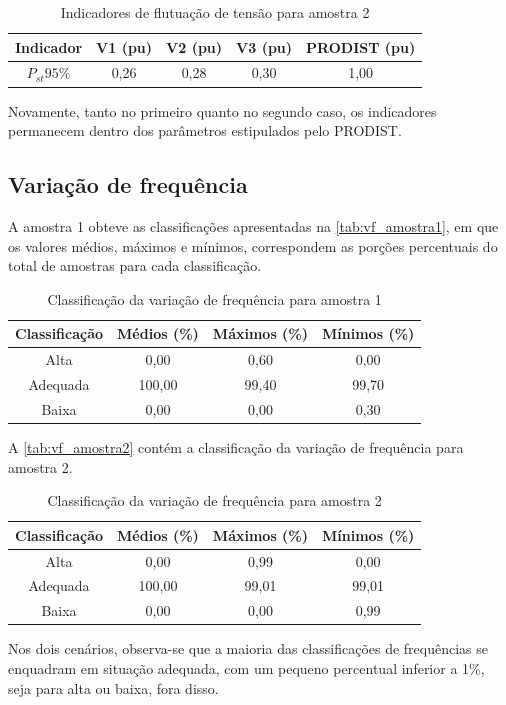 \begin{table}[H]
  \centering
  \caption{Indicadores de flutuação de tensão para amostra 2}
  \label{tab:ft_amostra2}
  \begin{tabular}{@{}ccccc@{}}
    \toprule
    Indicador & V1 (pu) & V2 (pu) & V3 (pu) & PRODIST  (pu) \\
    \midrule
    $P_{st}95\%$   & 0,26 & 0,28 & 0,30 & 1,00 \\
    \bottomrule
  \end{tabular}
\end{table}

Novamente, tanto no primeiro quanto no segundo caso, os indicadores permanecem dentro dos parâmetros estipulados pelo PRODIST.

\subsection{Variação de frequência}

A amostra 1 obteve as classificações apresentadas na \autoref{tab:vf_amostra1}, em que os valores médios, máximos e mínimos, correspondem as porções percentuais do total de amostras para cada classificação.

\begin{table}[H]
  \centering
  \caption{Classificação da variação de frequência para amostra 1}
  \label{tab:vf_amostra1}
  \begin{tabular}{@{}cccc@{}}
    \toprule
    Classificação & Médios (\%) & Máximos (\%) & Mínimos (\%) \\
    \midrule
    Alta & 0,00 & 0,60 & 0,00 \\
    Adequada & 100,00 & 99,40 & 99,70 \\
    Baixa & 0,00 & 0,00 & 0,30 \\
    \bottomrule
  \end{tabular}
\end{table}

A \autoref{tab:vf_amostra2} contém a classificação da variação de frequência para amostra 2.

\begin{table}[H]
  \centering
  \caption{Classificação da variação de frequência para amostra 2}
  \label{tab:vf_amostra2}
  \begin{tabular}{@{}cccc@{}}
    \toprule
    Classificação & Médios (\%) & Máximos (\%) & Mínimos (\%) \\
    \midrule
    Alta & 0,00 & 0,99 & 0,00 \\
    Adequada & 100,00 & 99,01 & 99,01 \\
    Baixa & 0,00 & 0,00 & 0,99 \\
    \bottomrule
  \end{tabular}
\end{table}

Nos dois cenários, observa-se que a maioria das classificações de frequências se enquadram em situação adequada, com um pequeno percentual inferior a 1\%, seja para alta ou baixa, fora disso.
